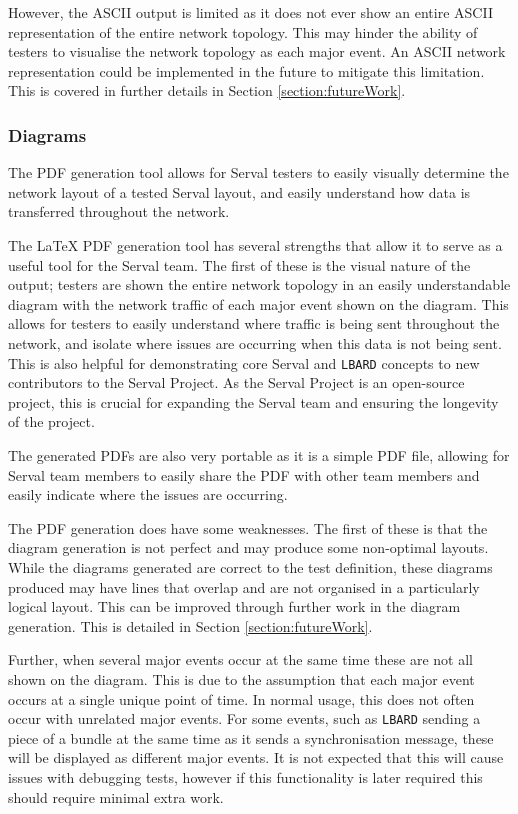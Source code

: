 However, the ASCII output is limited as it does not ever show an entire ASCII representation of the entire network topology.
This may hinder the ability of testers to visualise the network topology as each major event.
An ASCII network representation could be implemented in the future to mitigate this limitation.
This is covered in further details in Section \ref{section:futureWork}.

\subsubsection{Diagrams}
The PDF generation tool allows for Serval testers to easily visually determine the network layout of a tested Serval layout, and easily understand how data is transferred throughout the network.

The LaTeX PDF generation tool has several strengths that allow it to serve as a useful tool for the Serval team.
The first of these is the visual nature of the output; testers are shown the entire network topology in an easily understandable diagram with the network traffic of each major event shown on the diagram.
This allows for testers to easily understand where traffic is being sent throughout the network, and isolate where issues are occurring when this data is not being sent.
This is also helpful for demonstrating core Serval and \texttt{LBARD} concepts to new contributors to the Serval Project.
As the Serval Project is an open-source project, this is crucial for expanding the Serval team and ensuring the longevity of the project.

The generated PDFs are also very portable as it is a simple PDF file, allowing for Serval team members to easily share the PDF with other team members and easily indicate where the issues are occurring.

The PDF generation does have some weaknesses.
The first of these is that the diagram generation is not perfect and may produce some non-optimal layouts.
While the diagrams generated are correct to the test definition, these diagrams produced may have lines that overlap and are not organised in a particularly logical layout.
This can be improved through further work in the diagram generation.
This is detailed in Section \ref{section:futureWork}.

Further, when several major events occur at the same time these are not all shown on the diagram.
This is due to the assumption that each major event occurs at a single unique point of time.
In normal usage, this does not often occur with unrelated major events.
For some events, such as \texttt{LBARD} sending a piece of a bundle at the same time as it sends a synchronisation message, these will be displayed as different major events.
It is not expected that this will cause issues with debugging tests, however if this functionality is later required this should require minimal extra work.

